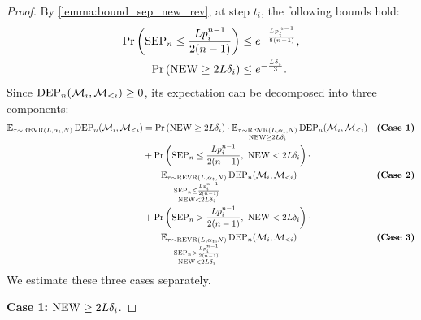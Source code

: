 \begin{proof}
By \cref{lemma:bound_sep_new_rev}, at step $t_i$, the following bounds hold:
\begin{align*}
        \Pr\left(\operatorname{SEP}_n\leq \frac{Lp_i^{n-1}}{2(n-1)}\right)&\leq e^{-\frac{Lp_i^{n-1}}{8(n-1)}},\\
        \Pr\left(\operatorname{NEW}\geq 2L\delta_i\right)&\leq e^{-\frac{L\delta_i}{3}}.
\end{align*}
Since $\operatorname{DEP}_n({\mathcal{M}}_i, {\mathcal{M}}_{<i})\geq 0$, its expectation can be decomposed into three components:
\begin{align*}
    \mathbb{E}_{\tau \sim \operatorname{REVR}(L, \alpha_t, N)} \operatorname{DEP}_n({\mathcal{M}}_i, {\mathcal{M}}_{<i})&=\Pr\left(\operatorname{NEW}\geq 2L\delta_i\right)\cdot \mathbb{E}_{\substack{\tau \sim \operatorname{REVR}(L, \alpha_t, N)\\ \operatorname{NEW}\geq 2L\delta_i}} \operatorname{DEP}_n({\mathcal{M}}_i, {\mathcal{M}}_{<i})&\textbf{(Case 1)}\\
    &+\Pr\left(\operatorname{SEP}_n\leq \frac{Lp_i^{n-1}}{2(n-1)},\ \operatorname{NEW}< 2L\delta_i\right)\cdot \\
    &\qquad\mathbb{E}_{\substack{\tau \sim \operatorname{REVR}(L, \alpha_t, N)\\ \operatorname{SEP}_n\leq \frac{Lp_i^{n-1}}{2(n-1)}\\ \operatorname{NEW}< 2L\delta_i}} \operatorname{DEP}_n({\mathcal{M}}_i, {\mathcal{M}}_{<i}) &\textbf{(Case 2)}\\
    &+\Pr\left(\operatorname{SEP}_n>\frac{Lp_i^{n-1}}{2(n-1)},\ \operatorname{NEW}< 2L\delta_i\right)\cdot \\
    &\qquad\mathbb{E}_{\substack{\tau \sim \operatorname{REVR}(L, \alpha_t, N)\\ \operatorname{SEP}_n>\frac{Lp_i^{n-1}}{2(n-1)}\\ \operatorname{NEW}<2L\delta_i}} \operatorname{DEP}_n({\mathcal{M}}_i, {\mathcal{M}}_{<i})&\textbf{(Case 3)}
\end{align*}
We estimate these three cases separately.

\textbf{Case 1:} $\operatorname{NEW}\geq 2L\delta_i$.


\end{proof}
